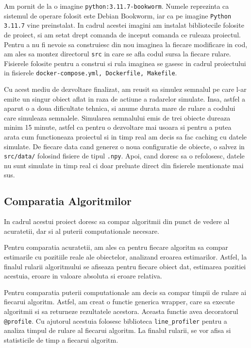 \documentclass{article}
\begin{document}
Am pornit de la o imagine \verb|python:3.11.7-bookworm|.
Numele reprezinta ca sistemul de operare folosit este Debian Bookworm, iar ca pe imagine \verb|Python 3.11.7| vine preinstalat.
In cadrul acestei imagini am instalat bibliotecile folosite de proiect, si am setat drept comanda de inceput comanda ce ruleaza proiectul.
Pentru a nu fi nevoie sa construiesc din nou imaginea la fiecare modificare in cod, am ales sa montez directorul \verb|src| in care se afla codul sursa la fiecare rulare.
Fisierele folosite pentru a construi si rula imaginea se gasesc in cadrul proiectului in fisierele \verb|docker-compose.yml, Dockerfile, Makefile|.

Cu acest mediu de dezvoltare finalizat, am reusit sa simulez semnalul pe care l-ar emite un singur obiect aflat in raza de actiune a radarelor simulate.
Insa, astfel a aparut o a doua dificultate tehnica, si anume durata mare de rulare a codului care simuleaza semnalele.
Simularea semnalului emis de trei obiecte dureaza minim 15 minute, astfel ca pentru o dezvoltare mai usoara si pentru a putea arata cum functioneaza proiectul si in timp real am decis sa fac caching cu datele simulate.
De fiecare data cand generez o noua configuratie de obiecte, o salvez in \verb|src/data/| folosind fisiere de tipul \verb|.npy|.
Apoi, cand doresc sa o refolosesc, datele nu sunt simulate in timp real ci doar preluate direct din fisierele mentionate mai sus.

\subsection{Comparatia Algoritmilor}

In cadrul acestui proiect doresc sa compar algoritmii din punct de vedere al acuratetii, dar si al puterii computationale necesare.

Pentru comparatia acuratetii, am ales ca pentru fiecare algoritm sa compar estimarile cu pozitiile reale ale obiectelor, analizand eroarea estimarilor.
Astfel, la finalul rularii algoritmului se afiseaza pentru fiecare obiect dat, estimarea pozitiei acestuia, eroare in valoare absoluta si eroare relativa.

Pentru comparatia puterii computationale am decis sa compar timpii de rulare ai fiecarui algoritm.
Astfel, am creat o functie generica wrapper, care sa execute algoritmii si sa returneze rezultatele acestora.
Aceasta functie avea decoratorul \verb|@profile|.
Cu ajutorul acestuia folosesc biblioteca \verb|line_profiler| pentru a analiza timpul de rulare al fiecarui algoritm.
La finalul rularii, se vor afisa si statisticile de timp a fiecarui algoritm.
\end{document}
